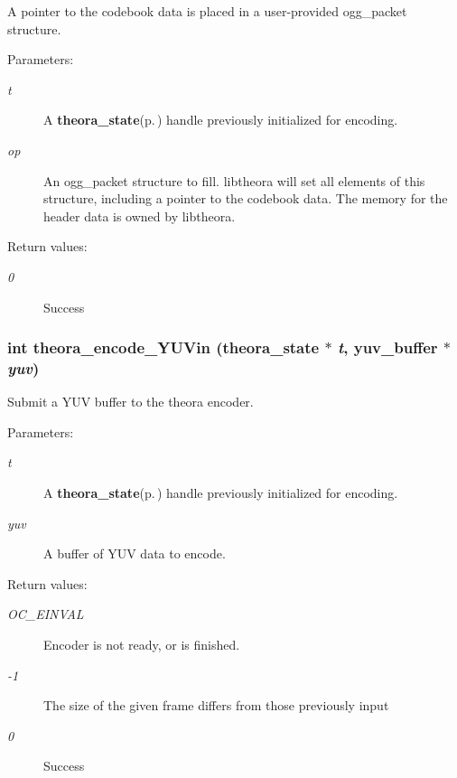 A pointer to the codebook data is placed in a user-provided ogg\_\-packet structure. \begin{Desc}
\item[Parameters:]
\begin{description}
\item[{\em t}]A {\bf theora\_\-state}{\rm (p.\,\pageref{structtheora__state})} handle previously initialized for encoding. \item[{\em op}]An ogg\_\-packet structure to fill. libtheora will set all elements of this structure, including a pointer to the codebook data. The memory for the header data is owned by libtheora. \end{description}
\end{Desc}
\begin{Desc}
\item[Return values:]
\begin{description}
\item[{\em 0}]Success \end{description}
\end{Desc}
\subsubsection{\setlength{\rightskip}{0pt plus 5cm}int theora\_\-encode\_\-YUVin ({\bf theora\_\-state} $\ast$ {\em t}, {\bf yuv\_\-buffer} $\ast$ {\em yuv})}\label{theora_8h_a16}


Submit a YUV buffer to the theora encoder. 

\begin{Desc}
\item[Parameters:]
\begin{description}
\item[{\em t}]A {\bf theora\_\-state}{\rm (p.\,\pageref{structtheora__state})} handle previously initialized for encoding. \item[{\em yuv}]A buffer of YUV data to encode. \end{description}
\end{Desc}
\begin{Desc}
\item[Return values:]
\begin{description}
\item[{\em OC\_\-EINVAL}]Encoder is not ready, or is finished. \item[{\em -1}]The size of the given frame differs from those previously input \item[{\em 0}]Success \end{description}
\end{Desc}
